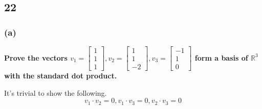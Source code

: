 \documentclass[10pt,letterpaper]{article}
\begin{document}
	\subsection*{22} 
	\subsubsection*{(a)} \textbf{Prove the vectors $v_1 = \begin{bmatrix}
		1 \\ 1 \\ 1
		\end{bmatrix}, v_2 = \begin{bmatrix}
		1 \\ 1 \\ -2
		\end{bmatrix}, v_3 = \begin{bmatrix}
			-1 \\ 1 \\ 0
			\end{bmatrix} $ form a basis of $\mathbb{R}^3$ with the standard dot product. }
		
		It's trivial to show the following. 
		$$
		\boxed{v_1 \cdot v_2 = 0, v_1 \cdot v_3 = 0, v_2 \cdot v_3 = 0}
		$$
\end{document}

